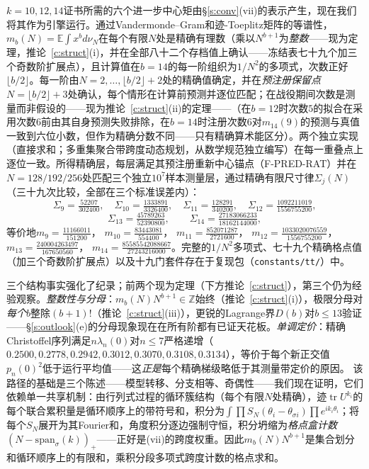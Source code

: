 \documentclass[11pt]{article}
\numberwithin{equation}{section}
\theoremstyle{definition}
\theoremstyle{remark}
\begin{document}
$k=10,12,14$证书所需的六个进一步中心矩由\S\ref{s:conv}(vii)的表示产生，现在我们将其作为引擎运行。通过Vandermonde--Gram和迹-Toeplitz矩阵的等谱性，$m_b(N)=\mathbb E\int x^{b}d\nu_N$在每个有限$N$处是精确有理数（乘以$N^{b+1}$为\emph{整数}——现为定理，推论~\ref{c:struct}(i)，并在全部八十二个存档值上确认——冻结表七十九个加三个奇数阶扩展点），且计算值在$b=14$的每一阶组织为$1/N^{2}$的多项式，次数正好$\lfloor b/2\rfloor$。每一阶由$N=2,\dots,\lfloor b/2\rfloor+2$处的精确值确定，并在\emph{预注册保留点}$N=\lfloor b/2\rfloor+3$处确认，每个情形在计算前预测并逐位匹配；在战役期间次数是测量而非假设的——现为推论~\ref{c:struct}(ii)的定理——（在$b=12$时次数$5$的拟合在采用次数$6$前由其自身预测失败排除，在$b=14$时注册次数$6$对$m_{14}(9)$的预测与真值一致到六位小数，但作为精确分数不同——只有精确算术能区分）。两个独立实现（直接求和；多重集聚合带跨度动态规划，从数学规范独立编写）在每一重叠点上逐位一致。所得精确层，每层满足其预注册重新中心锚点（F-PRED-RAT）并在$N=128/192/256$处匹配三个独立$10^{7}$样本测量层，通过精确有限尺寸律$\Sigma_j(N)$（三十九次比较，全部在三个标准误差内）：
\[
\Sigma_9=\tfrac{52207}{302400},\quad
\Sigma_{10}=\tfrac{1333891}{3326400},\quad
\Sigma_{11}=\tfrac{128291}{340200},\quad
\Sigma_{12}=\tfrac{1092211019}{1556755200},
\]
\[
\Sigma_{13}=\tfrac{45789263}{52390800},\qquad
\Sigma_{14}=\tfrac{27183066233}{18162144000},
\]
等价地$m_9=\tfrac{11166011}{151200}$，
$m_{10}=\tfrac{83443081}{554400}$，
$m_{11}=\tfrac{852071287}{2721600}$，
$m_{12}=\tfrac{1033020076559}{1556755200}$，
$m_{13}=\tfrac{240004263497}{167650560}$，
$m_{14}=\tfrac{85585542088667}{27243216000}$。完整的$1/N^{2}$多项式、七十九个精确格点值（加三个奇数阶扩展点）以及十九门套件存在于复现包（\texttt{constants/tt/}）中。

三个结构事实强化了纪录；前两个现为定理（下方推论~\ref{c:struct}），第三个仍为经验观察。\emph{整数性与分母}：$m_b(N)N^{b+1}\in\mathbb Z$始终（推论~\ref{c:struct}(i)），极限分母对\emph{每个}$b$整除$(b{+}1)!$（推论~\ref{c:struct}(iii)），更锐的Lagrange界$D(b)$对$b\le13$验证——\S\ref{s:outlook}(e)的分母现象现在在所有阶都有已证天花板。\emph{单调定价}：精确Christoffel序列满足$n\lambda_n(0)$对$n\le7$严格递增（$0.2500,0.2778,0.2942,0.3012,0.3070,0.3108,0.3134$），等价于每个新正交值$p_n(0)^2$低于运行平均值——这\emph{正是}每个精确梯级略低于其测量带定价的原因。
该路径的基础是三个陈述——模型转移、分支相等、奇偶性——我们现在证明，它们依赖单一共享机制：由行列式过程\cite{Sos00}的循环簇结构（每个有限$N$处精确），迹$\operatorname{tr}U^{k_i}$的每个联合累积量是循环顺序上的带符号和，积分为$\int\prod S_N(\theta_i-\theta_{\sigma i}) \prod e^{ik_i\theta_i}$；将每个$S_N$展开为其Fourier和，角度积分逐边强制守恒，积分坍缩为\emph{格点盒计数}$(N-\mathrm{span}_\sigma(k))_+$——正好是(vii)的跨度权重。因此$m_b(N)N^{b+1}$是集合划分和循环顺序上的有限和，乘积分段多项式跨度计数的格点求和。
\end{document}
